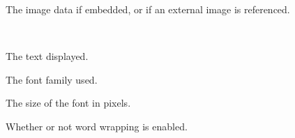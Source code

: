 \documentclass[letterpaper,10pt,english]{sphinxmanual}
\begin{document}
\begin{fulllineitems}
\begin{fulllineitems}
\end{fulllineitems}


\begin{fulllineitems}
\label{index:tmx.Image.data}
The image data if embedded, or  if an external image
is referenced.

\end{fulllineitems}


\end{fulllineitems}


\begin{fulllineitems}
\label{index:tmx.Text}~

\begin{fulllineitems}
\label{index:tmx.Text.text}
The text displayed.

\end{fulllineitems}


\begin{fulllineitems}
\label{index:tmx.Text.fontfamily}
The font family used.

\end{fulllineitems}


\begin{fulllineitems}
\label{index:tmx.Text.pixelsize}
The size of the font in pixels.

\end{fulllineitems}


\begin{fulllineitems}
\label{index:tmx.Text.wrap}
Whether or not word wrapping is enabled.

\end{fulllineitems}


\end{fulllineitems}
\end{document}

